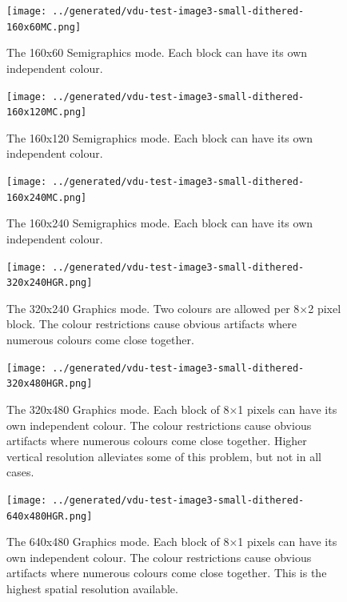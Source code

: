 \begin{figure}[p]
  \centering
  \texttt{[image: ../generated/vdu-test-image3-small-dithered-160x60MC.png]}%
  \caption[160×60 Semigraphics mode]{\label{fig:vdu:mode-160x60}The 160x60 Semigraphics mode.
    Each block can have its own independent colour.
  }
\end{figure}

\begin{figure}[p]
  \centering
  \texttt{[image: ../generated/vdu-test-image3-small-dithered-160x120MC.png]}%
  \caption[160×120 Semigraphics mode]{\label{fig:vdu:mode-160x120mc}The 160x120 Semigraphics mode.
    Each block can have its own independent colour.
  }
\end{figure}

\begin{figure}[p]
  \centering
  \texttt{[image: ../generated/vdu-test-image3-small-dithered-160x240MC.png]}%
  \caption[160×240 Semigraphics mode]{\label{fig:vdu:mode-160x240mc}The 160x240
    Semigraphics mode.  Each block can have its own independent colour.}
\end{figure}

\begin{figure}[p]
  \centering
  \texttt{[image: ../generated/vdu-test-image3-small-dithered-320x240HGR.png]}%
  \caption[320×240 Graphics mode]{\label{fig:vdu:mode-320x240hgr}The 320x240
    Graphics mode.  Two colours are allowed per 8×2 pixel block.  The colour
    restrictions cause obvious artifacts where numerous colours come close
    together.  }
\end{figure}


\begin{figure}[p]
  \centering
  \texttt{[image: ../generated/vdu-test-image3-small-dithered-320x480HGR.png]}%
  \caption[320×480 Graphics mode]{\label{fig:vdu:mode-320x480hgr}The 320x480 Graphics mode.
    Each block of 8×1 pixels can have its own independent colour.
    The colour restrictions cause obvious artifacts where numerous colours come close together.
    Higher vertical resolution alleviates some of this problem, but not in all cases.
  }
\end{figure}


\begin{figure}
  \centering
  \texttt{[image: ../generated/vdu-test-image3-small-dithered-640x480HGR.png]}%
  \caption[640×480 Graphics mode]{\label{fig:vdu:mode-640x480hgr}The 640x480 Graphics mode.
    Each block of 8×1 pixels can have its own independent colour.
    The colour restrictions cause obvious artifacts where numerous colours come close together.
    This is the highest spatial resolution available.
  }
\end{figure}




